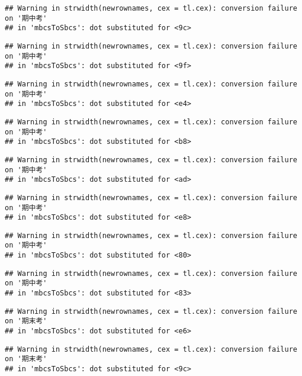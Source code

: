 \documentclass[
]{book}
\begin{document}
\begin{verbatim}
## Warning in strwidth(newrownames, cex = tl.cex): conversion failure on '期中考'
## in 'mbcsToSbcs': dot substituted for <9c>
\end{verbatim}

\begin{verbatim}
## Warning in strwidth(newrownames, cex = tl.cex): conversion failure on '期中考'
## in 'mbcsToSbcs': dot substituted for <9f>
\end{verbatim}

\begin{verbatim}
## Warning in strwidth(newrownames, cex = tl.cex): conversion failure on '期中考'
## in 'mbcsToSbcs': dot substituted for <e4>
\end{verbatim}

\begin{verbatim}
## Warning in strwidth(newrownames, cex = tl.cex): conversion failure on '期中考'
## in 'mbcsToSbcs': dot substituted for <b8>
\end{verbatim}

\begin{verbatim}
## Warning in strwidth(newrownames, cex = tl.cex): conversion failure on '期中考'
## in 'mbcsToSbcs': dot substituted for <ad>
\end{verbatim}

\begin{verbatim}
## Warning in strwidth(newrownames, cex = tl.cex): conversion failure on '期中考'
## in 'mbcsToSbcs': dot substituted for <e8>
\end{verbatim}

\begin{verbatim}
## Warning in strwidth(newrownames, cex = tl.cex): conversion failure on '期中考'
## in 'mbcsToSbcs': dot substituted for <80>
\end{verbatim}

\begin{verbatim}
## Warning in strwidth(newrownames, cex = tl.cex): conversion failure on '期中考'
## in 'mbcsToSbcs': dot substituted for <83>
\end{verbatim}

\begin{verbatim}
## Warning in strwidth(newrownames, cex = tl.cex): conversion failure on '期末考'
## in 'mbcsToSbcs': dot substituted for <e6>
\end{verbatim}

\begin{verbatim}
## Warning in strwidth(newrownames, cex = tl.cex): conversion failure on '期末考'
## in 'mbcsToSbcs': dot substituted for <9c>
\end{verbatim}
\end{document}
